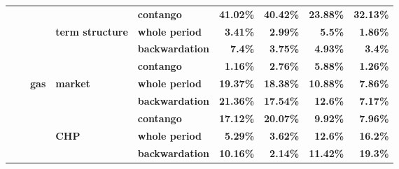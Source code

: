 \documentclass[
  authoryear,
  preprint,
  3p]{elsarticle}
\begin{document}
\begin{longtable}[t]{>{}l>{}l>{}l>{}l>{}l>{}r>{}r>{}r>{}r}
\addlinespace
\textbf{} & \textbf{} & \textbf{} & \textbf{} & \textbf{contango} & \textcolor[HTML]{4285f4}{\textbf{41.02\%}} & \textcolor[HTML]{4285f4}{\textbf{40.42\%}} & \textcolor[HTML]{4285f4}{\textbf{23.88\%}} & \textcolor[HTML]{4285f4}{\textbf{32.13\%}}\\
\textbf{} & \textbf{} & \textbf{} & \textbf{term structure} & \textbf{whole period} & \textcolor[HTML]{4285f4}{\textbf{3.41\%}} & \textcolor[HTML]{4285f4}{\textbf{2.99\%}} & \textcolor[HTML]{4285f4}{\textbf{5.5\%}} & \textcolor[HTML]{4285f4}{\textbf{1.86\%}}\\
\textbf{} & \textbf{} & \textbf{} & \textbf{} & \textbf{backwardation} & \textcolor[HTML]{4285f4}{\textbf{7.4\%}} & \textcolor[HTML]{4285f4}{\textbf{3.75\%}} & \textcolor[HTML]{4285f4}{\textbf{4.93\%}} & \textcolor[HTML]{4285f4}{\textbf{3.4\%}}\\
\textbf{} & \textbf{} & \textbf{} & \textbf{} & \textbf{contango} & \textcolor[HTML]{4285f4}{\textbf{1.16\%}} & \textcolor[HTML]{4285f4}{\textbf{2.76\%}} & \textcolor[HTML]{4285f4}{\textbf{5.88\%}} & \textcolor[HTML]{4285f4}{\textbf{1.26\%}}\\
\textbf{} & \textbf{} & \textbf{gas} & \textbf{market} & \textbf{whole period} & \textcolor[HTML]{4285f4}{\textbf{19.37\%}} & \textcolor[HTML]{4285f4}{\textbf{18.38\%}} & \textcolor[HTML]{4285f4}{\textbf{10.88\%}} & \textcolor[HTML]{4285f4}{\textbf{7.86\%}}\\
\addlinespace
\textbf{} & \textbf{} & \textbf{} & \textbf{} & \textbf{backwardation} & \textcolor[HTML]{4285f4}{\textbf{21.36\%}} & \textcolor[HTML]{4285f4}{\textbf{17.54\%}} & \textcolor[HTML]{4285f4}{\textbf{12.6\%}} & \textcolor[HTML]{4285f4}{\textbf{7.17\%}}\\
\textbf{} & \textbf{} & \textbf{} & \textbf{} & \textbf{contango} & \textcolor[HTML]{4285f4}{\textbf{17.12\%}} & \textcolor[HTML]{4285f4}{\textbf{20.07\%}} & \textcolor[HTML]{4285f4}{\textbf{9.92\%}} & \textcolor[HTML]{4285f4}{\textbf{7.96\%}}\\
\textbf{} & \textbf{} & \textbf{} & \textbf{CHP} & \textbf{whole period} & \textcolor[HTML]{4285f4}{\textbf{5.29\%}} & \textcolor[HTML]{4285f4}{\textbf{3.62\%}} & \textcolor[HTML]{4285f4}{\textbf{12.6\%}} & \textcolor[HTML]{4285f4}{\textbf{16.2\%}}\\
\textbf{} & \textbf{} & \textbf{} & \textbf{} & \textbf{backwardation} & \textcolor[HTML]{4285f4}{\textbf{10.16\%}} & \textcolor[HTML]{4285f4}{\textbf{2.14\%}} & \textcolor[HTML]{4285f4}{\textbf{11.42\%}} & \textcolor[HTML]{4285f4}{\textbf{19.3\%}}\\

\end{longtable}
\end{document}
